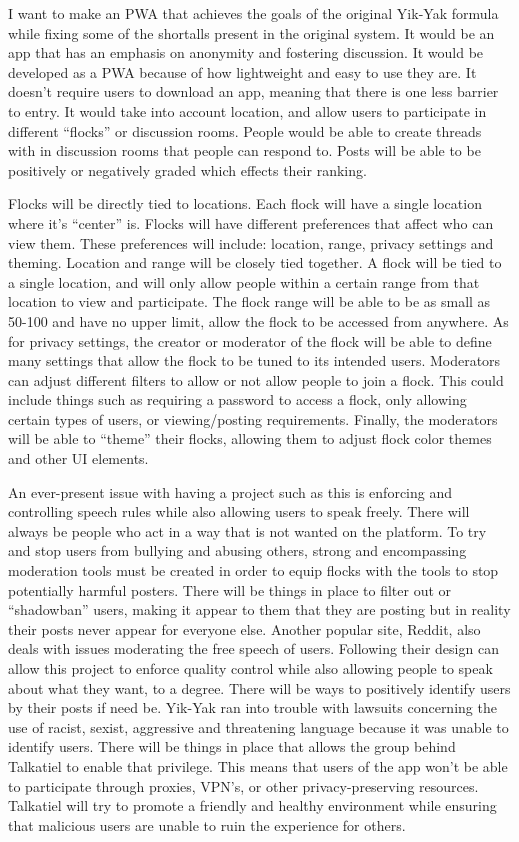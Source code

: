 \documentclass[12pt]{article}
\begin{document}
I want to make an PWA that achieves the goals of the original Yik-Yak formula while fixing some of the shortalls present in the original system.  It would be an app that has an emphasis on anonymity and fostering discussion.  It would be developed as a PWA because of how lightweight and easy to use they are.  It doesn’t require users to download an app, meaning that there is one less barrier to entry.  It would take into account location, and allow users to participate in different “flocks” or discussion rooms.  People would be able to create threads with in discussion rooms that people can respond to.  Posts will be able to be positively or negatively graded which effects their ranking.

Flocks will be directly tied to locations.  Each flock will have a single location where it’s “center” is.  Flocks will have different preferences that affect who can view them.  These preferences will include: location, range, privacy settings and theming.  Location and range will be closely tied together.  A flock will be tied to a single location, and will only allow people within a certain range from that location to view and participate.  The flock range will be able to be as small as 50-100 and have no upper limit, allow the flock to be accessed from anywhere.  As for privacy settings, the creator or moderator of the flock will be able to define many settings that allow the flock to be tuned to its intended users.  Moderators can adjust different filters to allow or not allow people to join a flock.  This could include things such as requiring a password to access a flock, only allowing certain types of users, or viewing/posting requirements.  Finally, the moderators will be able to “theme” their flocks, allowing them to adjust flock color themes and other UI elements. 

An ever-present issue with having a project such as this is enforcing and controlling speech rules while also allowing users to speak freely.  There will always be people who act in a way that is not wanted on the platform.  To try and stop users from bullying and abusing others, strong and encompassing moderation tools must be created in order to equip flocks with the tools to stop potentially harmful posters.  There will be things in place to filter out or “shadowban” users, making it appear to them that they are posting but in reality their posts never appear for everyone else.  Another popular site, Reddit, also deals with issues moderating the free speech of users.  Following their design can allow this project to enforce quality control while also allowing people to speak about what they want, to a degree.  There will be ways to positively identify users by their posts if need be.  Yik-Yak ran into trouble with lawsuits concerning the use of racist, sexist, aggressive and threatening language because it was unable to identify users.  There will be things in place that allows the group behind Talkatiel to enable that privilege.  This means that users of the app won’t be able to participate through proxies, VPN’s, or other privacy-preserving resources.  Talkatiel will try to promote a friendly and healthy environment while ensuring that malicious users are unable to ruin the experience for others.
\end{document}
